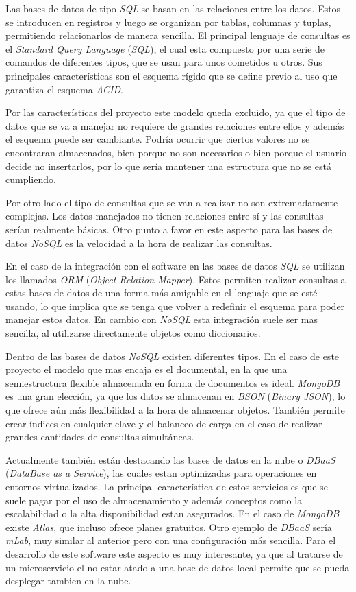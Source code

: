 Las bases de datos de tipo \textit{SQL} se basan en las relaciones entre los datos. Estos se introducen en registros y luego se organizan por tablas, columnas y tuplas, permitiendo relacionarlos de manera sencilla. El principal lenguaje de consultas es el \textit{Standard Query Language} (\textit{SQL}), el cual esta compuesto por una serie de comandos de diferentes tipos, que se usan para unos cometidos u otros. Sus principales características son el esquema rígido que se define previo al uso que garantiza el esquema \textit{ACID}.

Por las características del proyecto este modelo queda excluido, ya que el tipo de datos que se va a manejar no requiere de grandes relaciones entre ellos y además el esquema puede ser cambiante. Podría ocurrir que ciertos valores no se encontraran almacenados, bien porque no son necesarios o bien porque el usuario decide no insertarlos, por lo que sería mantener una estructura que no se está cumpliendo.

Por otro lado el tipo de consultas que se van a realizar no son extremadamente complejas. Los datos manejados no tienen relaciones entre sí y las consultas serían realmente básicas. Otro punto a favor en este aspecto para las bases de datos \textit{NoSQL} es la velocidad a la hora de realizar las consultas.

En el caso de la integración con el software en las bases de datos \textit{SQL} se utilizan los llamados \textit{ORM} (\textit{Object Relation Mapper}). Estos permiten realizar consultas a estas bases de datos de una forma más amigable en el lenguaje que se esté usando, lo que implica que se tenga que volver a redefinir el esquema para poder manejar estos datos. En cambio con \textit{NoSQL} esta integración suele ser mas sencilla, al utilizarse directamente objetos como diccionarios.

Dentro de las bases de datos \textit{NoSQL} existen diferentes tipos. En el caso de este proyecto el modelo que mas encaja es el documental, en la que una semiestructura flexible almacenada en forma de documentos es ideal. \textit{MongoDB} es una gran elección, ya que los datos se almacenan en \textit{BSON} (\textit{Binary JSON}), lo que ofrece aún más flexibilidad a la hora de almacenar objetos. También permite crear índices en cualquier clave y el balanceo de carga en el caso de realizar grandes cantidades de consultas simultáneas.

Actualmente también están destacando las bases de datos en la nube o \textit{DBaaS} (\textit{DataBase as a Service}), las cuales estan optimizadas para operaciones en entornos virtualizados. La principal característica de estos servicios es que se suele pagar por el uso de almacenamiento y además conceptos como la escalabilidad o la alta disponibilidad estan asegurados. En el caso de \textit{MongoDB} existe \textit{Atlas}, que incluso ofrece planes gratuitos. Otro ejemplo de \textit{DBaaS} sería \textit{mLab}, muy similar al anterior pero con una configuración más sencilla. Para el desarrollo de este software este aspecto es muy interesante, ya que al tratarse de un microservicio el no estar atado a una base de datos local permite que se pueda desplegar tambien en la nube.



